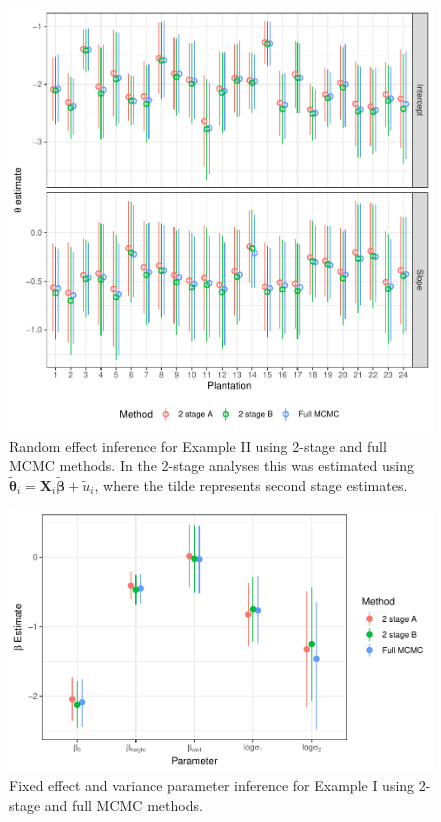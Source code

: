 \documentclass[12pt]{article}
\newcommand{\bt}{\boldsymbol{\theta}}
\newcommand{\bb}{\boldsymbol{\beta}}
\newcommand{\bX}{\mathbf{X}}
\begin{document}


\clearpage

\begin{figure}
\includegraphics[width=6.5in]{plt_theta}
\caption{\label{fig:theta.re}Random effect inference for Example II using 2-stage and full MCMC methods. In the 2-stage analyses this was estimated using $\tilde{\bt}_i = \bX_i\tilde{\bb} + \tilde{u}_i$, where the tilde represents second stage estimates.}
\end{figure}

\clearpage

\begin{figure}
\includegraphics[width=6.5in]{fixpar}
\caption{\label{fig:fixed.re}Fixed effect and variance parameter inference for Example I using 2-stage and full MCMC methods.}
\end{figure}
\end{document}
